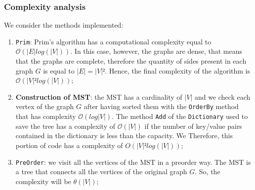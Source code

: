 \subsubsection{Complexity analysis}
We consider the methods implemented:
\begin{enumerate}
    \item \verb|Prim|: Prim's algorithm has a computational complexity equal to $\mathcal{O}(|E| log(|V|))$. In this case, however, the graphs are dense, that means that the graphs are complete, therefore the quantity of sides present in each graph $G$ is equal to $|E| = |V|²$. Hence, the final complexity of the algorithm is $\mathcal{O}(|V|² log(|V|))$;
    \item \textbf{Construction of MST}: the MST has a cardinality of $|V|$ and we check each vertex of the graph $G$ after having sorted them with the \verb|OrderBy| method that has complexity $\mathcal{O}(log |V|)$. The method \verb|Add| of the \verb|Dictionary| used to save the tree has a complexity of $\mathcal{O}(|V|)$ if the number of key/value pairs contained in the dictionary is less than the capacity. We  Therefore, this portion of code has a complexity of $ O(|V|² log (|V|))$;
    \item \verb|PreOrder|: we visit all the vertices of the MST in a preorder way. The MST is a tree that connects all the vertices of the original graph $ G $. So, the
     complexity will be $\theta(|V|)$;
\end{enumerate}